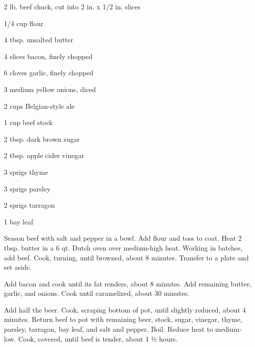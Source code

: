 \documentclass{cookbook}
\begin{document}

\begin{ingredients}
    \item 2 lb. beef chuck, cut into 2 in. x 1/2 in. slices
    \item 1/4 cup flour
    \item 4 tbsp. unsalted butter
    \item 4 slices bacon, finely chopped
    \item 6 cloves garlic, finely chopped
    \item 3 medium yellow onions, diced
    \item 2 cups Belgian-style ale
    \item 1 cup beef stock
    \item 2 tbsp. dark brown sugar
    \item 2 tbsp. apple cider vinegar
    \item 3 sprigs thyme
    \item 3 sprigs parsley
    \item 2 sprigs tarragon
    \item 1 bay leaf
\end{ingredients}

Season beef with salt and pepper in a bowl. Add flour and toss to coat. Heat 2 tbsp. butter in a 6 qt. Dutch oven over medium-high heat. Working in batches, add beef. Cook, turning, until browned, about 8 minutes. Transfer to a plate and set aside.

Add bacon and cook until its fat renders, about 8 minutes. Add remaining butter, garlic, and onions. Cook until caramelized, about 30 minutes.

Add half the beer. Cook, scraping bottom of pot, until slightly reduced, about 4 minutes. Return beef to pot with remaining beer, stock, sugar, vinegar, thyme, parsley, tarragon, bay leaf, and salt and pepper. Boil. Reduce heat to medium-low. Cook, covered, until beef is tender, about 1 ½ hours.

\end{document}
